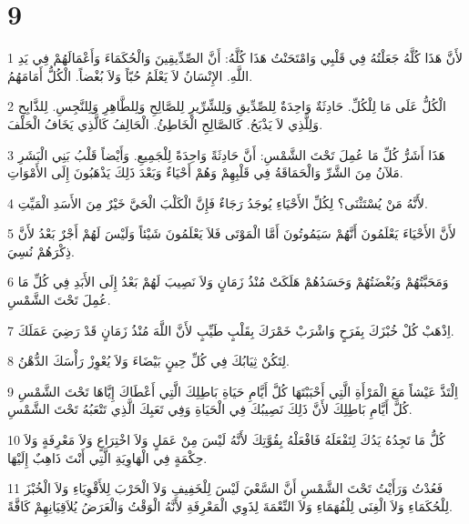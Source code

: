 \chapter{9}

\par 1 لأَنَّ هَذَا كُلَّهُ جَعَلْتُهُ فِي قَلْبِي وَامْتَحَنْتُ هَذَا كُلَّهُ: أَنَّ الصِّدِّيقِينَ وَالْحُكَمَاءَ وَأَعْمَالَهُمْ فِي يَدِ اللَّهِ. الإِنْسَانُ لاَ يَعْلَمُ حُبّاً وَلاَ بُغْضاً. الْكُلُّ أَمَامَهُمُ.
\par 2 الْكُلُّ عَلَى مَا لِلْكُلِّ. حَادِثَةٌ وَاحِدَةٌ لِلصِّدِّيقِ وَلِلشِّرِّيرِ لِلصَّالِحِ وَلِلطَّاهِرِ وَلِلنَّجِسِ. لِلذَّابِحِ وَلِلَّذِي لاَ يَذْبَحُ. كَالصَّالِحِ الْخَاطِئُ. الْحَالِفُ كَالَّذِي يَخَافُ الْحَلْفَ.
\par 3 هَذَا أَشَرُّ كُلِّ مَا عُمِلَ تَحْتَ الشَّمْسِ: أَنَّ حَادِثَةً وَاحِدَةً لِلْجَمِيعِ. وَأَيْضاً قَلْبُ بَنِي الْبَشَرِ مَلآنُ مِنَ الشَّرِّ وَالْحَمَاقَةُ فِي قَلْبِهِمْ وَهُمْ أَحْيَاءٌ وَبَعْدَ ذَلِكَ يَذْهَبُونَ إِلَى الأَمْوَاتِ.
\par 4 لأَنَّهُ مَنْ يُسْتَثْنَى؟ لِكُلِّ الأَحْيَاءِ يُوجَدُ رَجَاءٌ فَإِنَّ الْكَلْبَ الْحَيَّ خَيْرٌ مِنَ الأَسَدِ الْمَيِّتِ.
\par 5 لأَنَّ الأَحْيَاءَ يَعْلَمُونَ أَنَّهُمْ سَيَمُوتُونَ أَمَّا الْمَوْتَى فَلاَ يَعْلَمُونَ شَيْئاً وَلَيْسَ لَهُمْ أَجْرٌ بَعْدُ لأَنَّ ذِكْرَهُمْ نُسِيَ.
\par 6 وَمَحَبَّتُهُمْ وَبُغْضَتُهُمْ وَحَسَدُهُمْ هَلَكَتْ مُنْذُ زَمَانٍ وَلاَ نَصِيبَ لَهُمْ بَعْدُ إِلَى الأَبَدِ فِي كُلِّ مَا عُمِلَ تَحْتَ الشَّمْسِ.
\par 7 اِذْهَبْ كُلْ خُبْزَكَ بِفَرَحٍ وَاشْرَبْ خَمْرَكَ بِقَلْبٍ طَيِّبٍ لأَنَّ اللَّهَ مُنْذُ زَمَانٍ قَدْ رَضِيَ عَمَلَكَ.
\par 8 لِتَكُنْ ثِيَابُكَ فِي كُلِّ حِينٍ بَيْضَاءَ وَلاَ يُعْوِزْ رَأْسَكَ الدُّهْنُ.
\par 9 اِلْتَذَّ عَيْشاً مَعَ الْمَرْأَةِ الَّتِي أَحْبَبْتَهَا كُلَّ أَيَّامِ حَيَاةِ بَاطِلِكَ الَّتِي أَعْطَاكَ إِيَّاهَا تَحْتَ الشَّمْسِ كُلَّ أَيَّامِ بَاطِلِكَ لأَنَّ ذَلِكَ نَصِيبُكَ فِي الْحَيَاةِ وَفِي تَعَبِكَ الَّذِي تَتْعَبُهُ تَحْتَ الشَّمْسِ.
\par 10 كُلُّ مَا تَجِدُهُ يَدُكَ لِتَفْعَلَهُ فَافْعَلْهُ بِقُوَّتِكَ لأَنَّهُ لَيْسَ مِنْ عَمَلٍ وَلاَ اخْتِرَاعٍ وَلاَ مَعْرِفَةٍ وَلاَ حِكْمَةٍ فِي الْهَاوِيَةِ الَّتِي أَنْتَ ذَاهِبٌ إِلَيْهَا.
\par 11 فَعُدْتُ وَرَأَيْتُ تَحْتَ الشَّمْسِ أَنَّ السَّعْيَ لَيْسَ لِلْخَفِيفِ وَلاَ الْحَرْبَ لِلأَقْوِيَاءِ وَلاَ الْخُبْزَ لِلْحُكَمَاءِ وَلاَ الْغِنَى لِلْفُهَمَاءِ وَلاَ النِّعْمَةَ لِذَوِي الْمَعْرِفَةِ لأَنَّهُ الْوَقْتُ وَالْعَرَضُ يُلاَقِيَانِهِمْ كَافَّةً.
